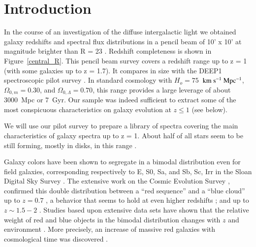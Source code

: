 \documentclass[referee]{aa}
\begin{document}
 \maketitle
 


\section{Introduction}


In the course of an investigation of the diffuse intergalactic light we obtained
galaxy redshifts and spectral flux distributions in a pencil beam of 10' x 10' at magnitude brighter than R = 23
\citep{Catalog:2012}. Redshift completeness is shown in Figure~\ref{central_R}.
This pencil beam survey covers  a redshift range up to z = 1 (with some galaxies up to z = 1.7). It compares in size 
with the DEEP1 spectroscopic pilot survey \citep{Weiner:2005}. 
In standard cosmology with $H_o = 75$~$\rm km~s^{-1}~Mpc^{-1}$, $\Omega_{0,m}=0.30$, and $\Omega_{0,\Lambda} = 0.70$,
this range provides a large leverage of about 3000~Mpc or 7~Gyr. Our sample
was indeed sufficient to extract
some of the most conspicuous characteristics on galaxy evolution at $z \leq 1$ (see below).

We will use our pilot survey to prepare a library of spectra covering
the main characteristics of galaxy spectra up to z = 1. About half
of all stars seem to be still forming, mostly in disks, in this range \citep{Dickinson:2003p4993, Hammer:2005p5042}.

Galaxy colors have been shown to segregate in a bimodal distribution 
\citep{Strateva:2001p5121, Hogg:2002p5043, Blanton:2003p4432} even for field 
galaxies, corresponding respectively to E, S0, Sa, and Sb, Sc, Irr in the 
Sloan Digital Sky Survey \citep[SDSS,][]{York:2000p5225}. The extensive work on the 
Cosmic Evolution Survey \citep[COSMOS,][]{Scoville:2007p5137}, 
confirmed this double distribution between a ``red sequence'' and a 
``blue cloud''  up to $z = 0.7$  \citep[][ and references therein]{Cassata:2007p4503}, 
a behavior that seems to hold at even higher redshifts
\citep[$z \sim 1$,][]{Bell:2004p4427}; and up to $z \sim 1.5-2$
\citep{Giallongo:2005p5002, Cucciati:2006p4973, Franzetti:2007p4273}. 
Studies based upon extensive data sets \citep{LeFevre:2007p5105, Franzetti:2007p4273}
have shown that the relative weight of red and blue objects in the bimodal distribution changes 
with $z$ and environment \citep{LeFevre:2007p5105, Franzetti:2007p4273}. More precisely,
an increase of massive red galaxies with cosmological time was discovered
\citep[][ DEEP2 and COMBO-17 data]{Bell:2004p4427, Faber:2007}. 
\end{document}
